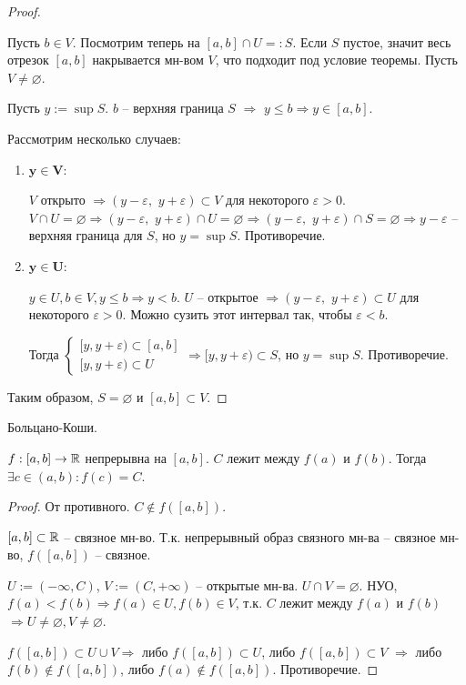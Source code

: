\begin{proof} $ $

    Пусть $b \in V$. Посмотрим теперь на $[a, b] \cap U =: S$. Если 
    $S$ пустое, значит весь отрезок $[a, b]$ накрывается мн-вом $V$,
    что подходит под условие теоремы. Пусть $V \neq \varnothing$.

    Пусть $y := \sup S$. $b$ -- верхняя граница $S$ $\Rightarrow$
    $y \leqslant b \Rightarrow y \in [a, b]$.

    Рассмотрим несколько случаев:
    \begin{enumerate}
        \item $\mathbf{y \in V}$:
        
        $V$ открыто $\Rightarrow (y - \varepsilon,\,\, y + \varepsilon)
        \subset V$ для некоторого $\varepsilon > 0$. $V \cap U =
        \varnothing \Rightarrow (y - \varepsilon,\,\, y + \varepsilon)
        \cap U = \varnothing \Rightarrow (y - \varepsilon,\,\, y + \varepsilon)
        \cap S = \varnothing \Rightarrow y - \varepsilon$ -- верхняя 
        граница для $S$, но $y = \sup S$. Противоречие.

        \item $\mathbf{y \in U}$:
        
        $y \in U, b \in V, y \leqslant b \Rightarrow y < b$. $U$ -- открытое 
        $\Rightarrow (y - \varepsilon,\,\, y + \varepsilon) \subset U$ для 
        некоторого $\varepsilon > 0$. Можно сузить этот интервал так,
        чтобы $\varepsilon < b$.
        
        Тогда $\begin{cases}
            [y, y + \varepsilon) \subset [a, b] \\
            [y, y + \varepsilon) \subset U
        \end{cases} \Rightarrow [y, y + \varepsilon) \subset S$,
        но $y = \sup S$. Противоречие.
    \end{enumerate}

    Таким образом, $S = \varnothing$ и $[a, b] \subset V$.
\end{proof}

\begin{theorem-non}
    Больцано-Коши.
\end{theorem-non}
$f : [a, b] \rightarrow \mathbb{R}$ непрерывна на $[a, b]$.
$C$ лежит между $f(a)$ и $f(b)$. Тогда $\exists c \in (a, b) : f(c) = C$.

\begin{proof} От противного. $C \notin f([a, b])$.

    $[a, b] \subset \mathbb{R}$ -- связное мн-во. Т.к. непрерывный образ связного 
    мн-ва -- связное мн-во, $f([a, b])$ -- связное. 

    $U := (-\infty, C)$, $V := (C, +\infty)$ -- открытые мн-ва.
    $U \cap V = \varnothing$. НУО, $f(a) < f(b) \Rightarrow
    f(a) \in U, f(b) \in V$, т.к. $C$ лежит между $f(a)$ и $f(b)$
    $\Rightarrow U \neq \varnothing, V \neq \varnothing$.

    $f([a, b]) \subset U \cup V \Rightarrow$ либо $f([a, b]) \subset U$,
    либо $f([a, b]) \subset V$ $\Rightarrow$ либо $f(b) \notin f([a, b])$,
    либо $f(a) \notin f([a, b])$. Противоречие.

\end{proof}
